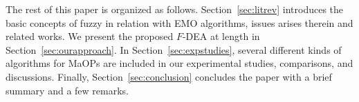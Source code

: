 \documentclass[review]{elsarticle}
\begin{document}
%
%

The rest of this paper is organized as follows. Section~\ref{sec:litrev} introduces the basic concepts of fuzzy in relation with EMO algorithms, issues arises therein and related works. 
We present the proposed $F$-DEA at length in Section~\ref{sec:ourapproach}. In Section~\ref{sec:expstudies}, several different kinds of algorithms for MaOPs are included in our experimental studies, comparisons, and discussions.
Finally, Section~\ref{sec:conclusion} concludes the paper
with a brief summary and a few remarks.
\end{document}
